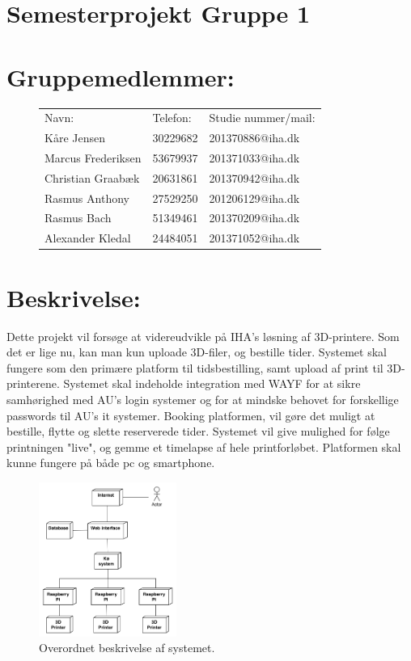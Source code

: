 


\section*{Semesterprojekt Gruppe 1}

\section*{Gruppemedlemmer:}
\begin{figure}[hbtp]
 \centering
\begin{longtable}{L{0.3\textwidth}L{0.2\textwidth}L{0.3\textwidth}}
Navn: & Telefon: & Studie nummer/mail: \\
Kåre Jensen & 30229682 & 201370886@iha.dk \\
Marcus Frederiksen & 53679937 & 201371033@iha.dk \\
Christian Graabæk & 20631861 & 201370942@iha.dk \\
Rasmus Anthony & 27529250 & 201206129@iha.dk \\
Rasmus Bach & 51349461 & 201370209@iha.dk \\
Alexander Kledal & 24484051 & 201371052@iha.dk \\
\end{longtable}
\end{figure}

\section*{Beskrivelse:}
Dette projekt vil forsøge at videreudvikle på IHA's løsning af 3D-printere. Som det er lige nu, kan man kun uploade 3D-filer, og bestille tider. Systemet skal fungere som den primære platform til tidsbestilling, samt upload af print til 3D-printerene.
Systemet skal indeholde integration med WAYF for at sikre samhørighed med AU's login systemer og for at mindske behovet for forskellige passwords til AU's it systemer.
Booking platformen, vil gøre det muligt at bestille, flytte og slette reserverede tider. Systemet vil give mulighed for følge printningen "live", og gemme et timelapse af hele printforløbet. Platformen skal kunne fungere på både pc og smartphone.


\begin{figure}[hbtp]
 \centering
\includegraphics[width=0.4\textwidth]{images/overall_system_diagram.png}
 \caption{Overordnet beskrivelse af systemet.}
\end{figure}








